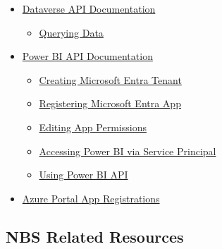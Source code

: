 \begin{itemize}
    \item \href{https://learn.microsoft.com/en-us/power-apps/developer/data-platform/webapi/overview}{Dataverse API Documentation}
    \begin{itemize}
        \item \href{https://learn.microsoft.com/en-us/power-apps/developer/data-platform/webapi/query/overview}{Querying Data}
    \end{itemize}
    
    \item \href{https://learn.microsoft.com/en-us/rest/api/power-bi/}{Power BI API Documentation}
    \begin{itemize}
        \item \href{https://learn.microsoft.com/en-us/power-bi/developer/embedded/create-an-azure-active-directory-tenant}{Creating Microsoft Entra Tenant}
        \item \href{https://learn.microsoft.com/en-us/power-bi/developer/embedded/register-app?tabs=customers}{Registering Microsoft Entra App}
        \item \href{https://learn.microsoft.com/en-us/power-bi/developer/embedded/change-permissions?tabs=Azure}{Editing App Permissions}
        \item \href{https://learn.microsoft.com/en-us/power-bi/developer/embedded/embed-service-principal}{Accessing Power BI via Service Principal}
        \item \href{https://learn.microsoft.com/en-us/rest/api/power-bi/}{Using Power BI API}
    \end{itemize}
    
    \item \href{https://learn.microsoft.com/en-us/entra/identity-platform/quickstart-register-app?tabs=certificate}{Azure Portal App Registrations}
\end{itemize}

\newpage

\subsection{NBS Related Resources}

